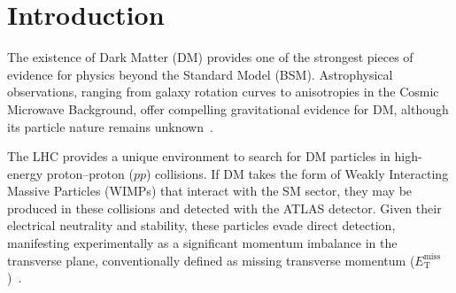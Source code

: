 

\section{Introduction}
\label{sec:monoZ_intro}

The existence of Dark Matter (DM) provides one of the strongest pieces of evidence for physics beyond the Standard Model (BSM). Astrophysical observations, ranging from galaxy rotation curves to anisotropies in the Cosmic Microwave Background, offer compelling gravitational evidence for DM, although its particle nature remains unknown~\cite{Bertone:2004pz}. 

The LHC provides a unique environment to search for DM particles in high-energy proton--proton ($pp$) collisions. If DM takes the form of Weakly Interacting Massive Particles (WIMPs) that interact with the SM sector, they may be produced in these collisions and detected with the ATLAS detector. Given their electrical neutrality and stability, these particles evade direct detection, manifesting experimentally as a significant momentum imbalance in the transverse plane, conventionally defined as missing transverse momentum ($E_{\text{T}}^{\text{miss}}$)~\cite{Abercrombie:2015wmb}.

